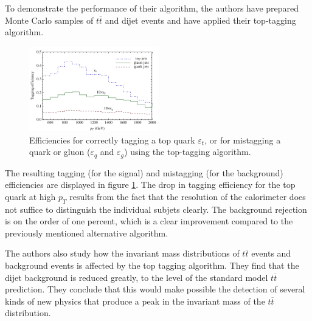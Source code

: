 To demonstrate the performance of their algorithm, the authors have prepared Monte Carlo samples of $t\overline{t}$ and dijet events and have applied their top-tagging algorithm.

\begin{figure}
  \includegraphics[width=0.5\textwidth]{figures/top-tagging-cropped.pdf}
  \caption{Efficiencies for correctly tagging a top quark $\varepsilon_t$, or for mistagging a quark or gluon ($\varepsilon_q$ and $\varepsilon_g$) using the top-tagging algorithm.\cite{kaplan}}
  \label{efficiencies}
\end{figure}

The resulting tagging (for the signal) and mistagging (for the background) efficiencies are displayed in figure \ref{efficiencies}.
The drop in tagging efficiency for the top quark at high $p_T$ results from the fact that the resolution of the calorimeter does not suffice to distinguish the individual subjets clearly.
The background rejection is on the order of one percent, which is a clear improvement compared to the previously mentioned alternative algorithm.

The authors also study how the invariant mass distributions of $t\overline{t}$ events and background events is affected by the top tagging algorithm.
They find that the dijet background is reduced greatly, to the level of the standard model $t\overline{t}$ prediction.
They conclude that this would make possible the detection of several kinds of new physics that produce a peak in the invariant mass of the $t\overline{t}$ distribution.

